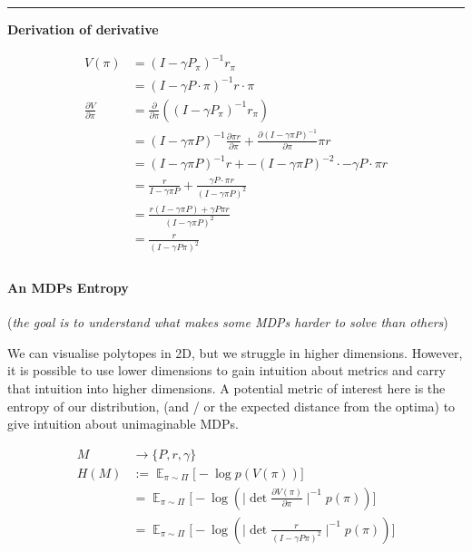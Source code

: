 \begin{center}\rule{0.5\linewidth}{\linethickness}\end{center}

\textbf{Derivation of derivative}

\begin{align}
V(\pi) &= (I − \gamma P_{\pi})^{−1}r_{\pi} \\
&= (I − \gamma P\cdot \pi)^{−1}r\cdot \pi \\
\frac{\partial V}{\partial \pi} &= \frac{\partial}{\partial \pi}((I-\gamma P_{\pi})^{-1} r_{\pi}) \\
&= (I-\gamma \pi P)^{-1} \frac{\partial \pi r}{\partial \pi}+   \frac{\partial (I-\gamma \pi P)^{-1}}{\partial \pi}\pi r\tag{product rule} \\
&= (I-\gamma \pi P)^{-1} r + -(I-\gamma \pi P)^{-2} \cdot -\gamma P\cdot \pi r\\
&= \frac{r}{I-\gamma \pi P} + \frac{ \gamma P\cdot \pi r}{(I-\gamma \pi P)^2}\\
&= \frac{r(I-\gamma \pi P) + \gamma P \pi r}{(I-\gamma \pi P)^2} \\
& = \frac{r}{(I-\gamma P \pi)^2} \\
\end{align}


\paragraph{An MDPs Entropy}

(\emph{the goal is to understand what makes some MDPs harder to solve
than others})

We can visualise polytopes in 2D, but we struggle in higher dimensions.
However, it is possible to use lower dimensions to gain intuition about
metrics and carry that intuition into higher dimensions. A potential
metric of interest here is the entropy of our distribution, (and / or
the expected distance from the optima) to give intuition about
unimaginable MDPs.

\begin{align}
M &\to \{P, r, \gamma\} \tag{a MDP}\\
H(M) &:= \mathop{\mathbb E}_{\pi\sim\Pi}\Big[-\log p(V(\pi)) \Big]\\
&= \mathop{\mathbb E}_{\pi\sim\Pi}\Big[-\log(\mid \det\frac{\partial V(\pi)}{\partial \pi}\mid^{-1}p(\pi)) \Big] \\
&= \mathop{\mathbb E}_{\pi\sim\Pi}\Big[-\log(\mid \det \frac{r}{(I-\gamma P \pi)^2}\mid^{-1}p(\pi)) \Big] \\
\end{align}

